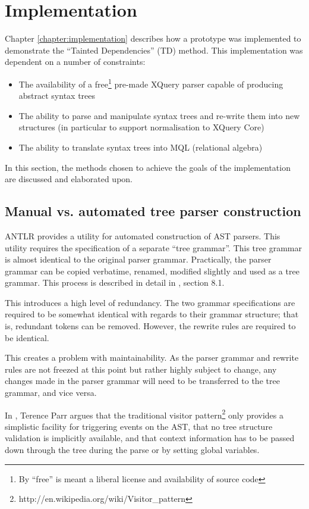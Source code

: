 \section{Implementation}
\label{sect:disc:contextSens}
Chapter \ref{chapter:implementation} describes how a prototype was implemented
to demonstrate the ``Tainted Dependencies'' (TD) method. This implementation
was dependent on a number of constraints:
\begin{itemize}
  \item The availability of a free\footnote{By ``free'' is meant a liberal
  license and availability of source code} pre-made XQuery parser capable of
  producing abstract syntax trees
  \item The ability to parse and manipulate syntax trees and re-write them into
  new structures (in particular to support normalisation to XQuery Core)
  \item The ability to translate syntax trees into MQL (relational algebra)
\end{itemize}

In this section, the methods chosen to achieve the goals of the implementation
are discussed and elaborated upon.

\subsection{Manual vs. automated tree parser construction}
ANTLR provides a utility for automated construction of AST parsers. This
utility requires the specification of a separate ``tree grammar''. This tree
grammar is almost identical to the original parser grammar. Practically, the
parser grammar can be copied verbatime, renamed, modified slightly and used as
a tree  grammar. This process is described in detail in \cite{definitiveAntlr},
section 8.1.

This introduces a high level of redundancy. The two grammar specifications are
required to be somewhat identical with regards to their grammar structure; that
is,  redundant tokens can be removed. However, the rewrite rules are required to
be identical.

This creates a problem with maintainability. As the parser grammar and rewrite
rules are not freezed at this point but rather highly subject to change, any
changes made in the parser grammar will need to be transferred to the tree
grammar, and vice versa. 

In \cite{translators_should_use_tree_grammars}, Terence Parr argues that the
traditional visitor
pattern\footnote{http://en.wikipedia.org/wiki/Visitor\_pattern} only provides a
simplistic facility for triggering events on the AST, that no tree structure
validation is implicitly available, and that context information has to be
passed down through the tree during the parse or by setting global variables.

